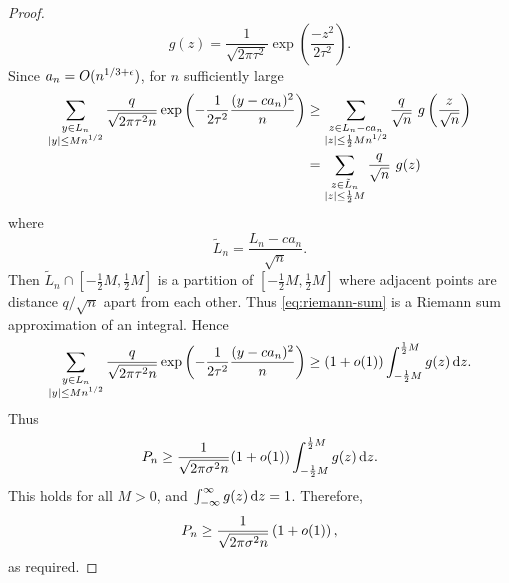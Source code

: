 \begin{proof}
\begin{equation*}
        g(z) = \frac{1}{\sqrt{2 \pi \tau^2}} \exp\left( \frac{-z^2}{2 \tau^2} \right).
    \end{equation*}
    Since $a_n = O(n^{1/3 + \epsilon})$, for $n$ sufficiently large
    \begin{align}
        \sum_{\substack{y \in L_n \\ \lvert y\rvert \leq M n^{1/2}}}
        \frac{q}{\sqrt{2 \pi \tau^2 n}} \exp \left( - \frac{1}{2 \tau^2} \frac{(y - ca_n)^2}{n} \right)
        &\geq \sum_{\substack{z \in L_n - ca_n\\ \lvert z\rvert \leq \frac{1}{2} M n^{1/2}}} 
        \frac{q}{\sqrt{n}}\ g \left( \frac{z}{\sqrt{n}} \right) \\
        &= \sum_{\substack{z \in \tilde{L}_n \\ \lvert z\rvert \leq \frac{1}{2} M }}
        \frac{q}{\sqrt{n}}\ g(z) \label{eq:riemann-sum}
    \end{align}
    where
    \begin{equation*}
        \tilde{L}_n = \frac{L_n - ca_n}{\sqrt{n}}.
    \end{equation*}
    Then $\tilde{L}_n \cap [-\frac{1}{2}M, \frac{1}{2}M]$ is a partition of $[-\frac{1}{2}M, \frac{1}{2}M]$ where adjacent points are distance $q/\sqrt{n}$ apart from each other. Thus \cref{eq:riemann-sum} is a Riemann sum approximation of an integral. Hence
    \begin{equation*}
        \sum_{\substack{y \in L_n \\ \lvert y\rvert \leq M n^{1/2}}}
        \frac{q}{\sqrt{2 \pi \tau^2 n}} \exp \left( - \frac{1}{2 \tau^2} \frac{(y - ca_n)^2}{n} \right)
        \geq (1 + o(1)) \int_{-\frac{1}{2} M}^{\frac{1}{2}M} g(z) \mathop{}\!\mathrm{d} z.
    \end{equation*}
    Thus
    \begin{equation*}
        P_n \geq \frac{1}{\sqrt{2 \pi \sigma^2 n}} (1 + o(1)) \int_{-\frac{1}{2} M}^{\frac{1}{2}M} g(z) \mathop{}\!\mathrm{d} z.
    \end{equation*}
    This holds for all $M > 0$, and $\int_{-\infty}^{\infty} g(z) \mathop{}\!\mathrm{d} z = 1$. Therefore,
    \begin{equation*}
        P_n \geq \frac{1}{\sqrt{2 \pi \sigma^2 n}} \left( 1 + o(1) \right),
    \end{equation*}
    as required.
\end{proof}